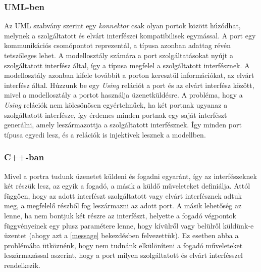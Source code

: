 \documentclass[a4paper,12pt]{report}
\begin{document}
\subsubsection{UML-ben}
Az UML szabvány szerint egy \textit{konnektor} csak olyan portok között
húzódhat, melynek a szolgáltatott és elvárt interfészei kompatibilisek egymással.
A port egy kommunikációs csomópontot reprezentál, a típusa azonban adattag révén tetszőleges lehet.
A modellosztály számára a port szolgáltatásokat nyújt a szolgáltatott interfész által, így a típusa megfelel a szolgáltatott interfésznek.
A modellosztály azonban kifele továbbít a porton keresztül információkat, az elvárt interfész által.
Húzzunk be egy \textit{Using} relációt a port és az elvárt interfész között, mivel a modellosztály a portot használja üzenetküldésre.
A probléma, hogy a \textit{Using} relációk nem kölcsönösen egyértelműek, ha két portnak ugyanaz a szolgáltatott interfésze, így
érdemes minden portnak egy saját interfészt generálni, amely leszármazottja a szolgáltatott interfésznek. Így minden port típusa egyedi lesz, és a relációk is injektívek lesznek a modellben.
\subsubsection{C++-ban}
Mivel a portra tudunk üzenetet küldeni és fogadni egyaránt, így az interfészeknek két részük lesz, az egyik a fogadó, a másik a küldő műveleteket definiálja. Attól függően, hogy az adott interfészt szolgáltatott vagy elvárt interfésznek adtuk meg, a megfelelő részből fog leszármazni az adott port. A másik lehetőség az lenne, ha nem bontjuk két részre az interfészt, helyette a fogadó végpontok függvényeinek egy plusz paramétere lenne, hogy kívülről vagy belülről küldünk-e üzentet (ahogy azt a \ref{message} bekezdésben felvezettük). Ez esetben abba a problémába ütköznénk, hogy nem tudnánk elkülöníteni a fogadó műveleteket leszármazással aszerint, hogy a port milyen szolgáltatott és elvárt interfésszel rendelkezik. \\
\end{document}
